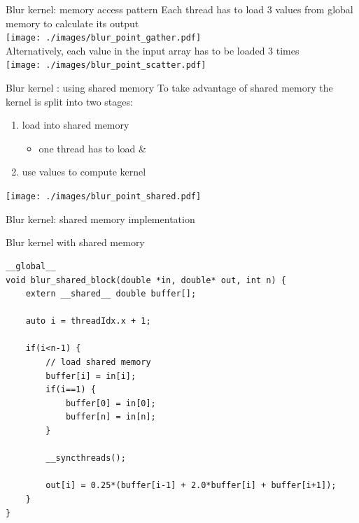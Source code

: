 \begin{frame}[fragile]{Blur kernel: memory access pattern}
    \centering
    Each thread has to load 3 values from global memory to calculate its output \\
    \texttt{[image: ./images/blur\_point\_gather.pdf]} \\
    Alternatively, each value in the input array has to be loaded 3 times \\
    \texttt{[image: ./images/blur\_point\_scatter.pdf]} \\
\end{frame}

\begin{frame}[fragile]{Blur kernel : using shared memory}
    To take advantage of shared memory the kernel is split into two stages:
    \begin{enumerate}
        \item load  into shared memory 
        \begin{itemize}
            \item one thread has to load  \& 
        \end{itemize}
        \item use values  to compute kernel
    \end{enumerate}

    \begin{center}
        \texttt{[image: ./images/blur\_point\_shared.pdf]}
    \end{center}
\end{frame}

\begin{frame}[fragile]{Blur kernel: shared memory implementation}
    \begin{code}{Blur kernel with shared memory}
        \begin{lstlisting}[style=boxcudatiny]
__global__
void blur_shared_block(double *in, double* out, int n) {
    extern __shared__ double buffer[];

    auto i = threadIdx.x + 1;

    if(i<n-1) {
        // load shared memory
        buffer[i] = in[i];
        if(i==1) {
            buffer[0] = in[0];
            buffer[n] = in[n];
        }

        __syncthreads();

        out[i] = 0.25*(buffer[i-1] + 2.0*buffer[i] + buffer[i+1]);
    }
}
        \end{lstlisting}
    \end{code}

\end{frame}

